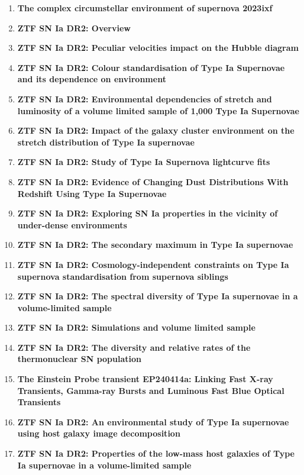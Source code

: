 \begin{singlespace}
\begin{enumerate}
\item \textbf{The complex circumstellar environment of supernova 2023ixf} \citep{2023ixf_CSM} %
\item \textbf{ZTF SN Ia DR2: Overview} \citep{DR2_Overview} %
\item \textbf{ZTF SN Ia DR2: Peculiar velocities impact on the Hubble diagram} \citep{DR2_peculiar_velocities} %
\item \textbf{ZTF SN Ia DR2: Colour standardisation of Type Ia Supernovae and its dependence on environment} \citep{DR2_colour} %
\item \textbf{ZTF SN Ia DR2: Environmental dependencies of stretch and luminosity of a volume limited sample of 1,000 Type Ia Supernovae} \citep{DR2_stretch} %
\item \textbf{ZTF SN Ia DR2: Impact of the galaxy cluster environment on the stretch distribution of Type Ia supernovae} \citep{DR2_clusters} %
\item \textbf{ZTF SN Ia DR2: Study of Type Ia Supernova lightcurve fits} \citep{DR2_lcs} %
\item \textbf{ZTF SN Ia DR2: Evidence of Changing Dust Distributions With Redshift Using Type Ia Supernovae} \citep{DR2_dust} %
\item \textbf{ZTF SN Ia DR2: Exploring SN Ia properties in the vicinity of under-dense environments} \citep{DR2_voids} %
\item \textbf{ZTF SN Ia DR2: The secondary maximum in Type Ia supernovae} \citep{DR2_2nd_max} %
\item \textbf{ZTF SN Ia DR2: Cosmology-independent constraints on Type Ia supernova standardisation from supernova siblings} \citep{DR2_siblings} %
\item \textbf{ZTF SN Ia DR2: The spectral diversity of Type Ia supernovae in a volume-limited sample} \citep{DR2_spec_div} %
\item \textbf{ZTF SN Ia DR2: Simulations and volume limited sample} \citep{DR2_sims} %
\item \textbf{ZTF SN Ia DR2: The diversity and relative rates of the thermonuclear SN population} \citep{DR2_diversity} %
\item \textbf{The Einstein Probe transient EP240414a: Linking Fast X-ray Transients, Gamma-ray Bursts and Luminous Fast Blue Optical Transients} \citep{EP240414a} %
\item \textbf{ZTF SN Ia DR2: An environmental study of Type Ia supernovae using host galaxy image decomposition} \citep{ZTF_DR2_hosts} %
\item \textbf{ZTF SN Ia DR2: Properties of the low-mass host galaxies of Type Ia supernovae in a volume-limited sample} \citep{ZTF_DR2_lowmass_hosts} %
\end{enumerate}




\end{singlespace}

